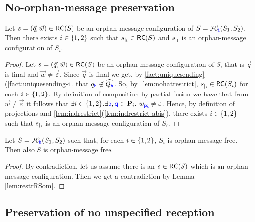 \subsection{No-orphan-message preservation}


\begin{lemma}%
\label{lem:restrRSom}
Let $s= (\vec{q},\vec{w}) \in \mathsf{RC}(S)$ be an orphan-message configuration of $S={\mathcal{F}\!\mathcal{C}}_{\!{\mathtt{\color{blue}{ {h}}}}}(S_1,S_2)$.
Then there exists $i\in \{1,2\}$ such that ${s}_{\mid_{\mathbf{i}}}\in \mathsf{RC}(S)$ and ${s}_{\mid_{\mathbf{i}}}$ is an  orphan-message configuration of $S_i$.
\end{lemma}

\begin{proof}
Let $s= (\vec{q},\vec{w}) \in \mathsf{RC}(S)$ be an orphan-message configuration of $S$, 
that is $\vec{q}$ is final and $\vec{w}\neq \vec{\varepsilon}$.
Since $\vec{q}$ is final we get, by  \cref{fact:uniquesending}(\ref{fact:uniquesending-i},  
that $q_{{\mathtt{\color{blue}{ {h}}}}}\not\in \widehat{Q_{{\mathtt{\color{blue}{ {h}}}}}}$.
So, by~\cref{lem:nohatrestrict}, ${s}_{\mid_{\mathbf{i}}}\in \mathsf{RC}(S_i)$ for each $i\in \{1,2\}$. 
By definition of composition by partial fusion we have that from $\vec{w}\neq \vec{\varepsilon}$
it follows that $\exists i\in \Set{1,2}.\exists \ttp,\ttq\in \roles_i.\ w_{\ttp\ttq}\neq\varepsilon$.
Hence, by definition of projections and \cref{lem:indrestrict}(\ref{lem:indrestrict-abis}),
there exists  $i\in \{1,2\}$ such that
${s}_{\mid_{\mathbf{i}}}$ is an  orphan-message configuration of $S_i$.
\end{proof}


\begin{corollary}%
\label{prop:nomPreservation}
Let $S = {\mathcal{F}\!\mathcal{C}}_{\!{\mathtt{\color{blue}{ {h}}}}}(S_1,S_2)$ such that, for each $i\in \{1,2\}$, 
$S_i$ is orphan-message free.
Then also $S$ is orphan-message free.
\end{corollary}
\begin{proof}
By contradiction, let us assume there is an $s\in \mathsf{RC}(S)$ which is an orphan-message configuration. Then we get
a contradiction by Lemma \ref{lem:restrRSom}.
\end{proof}



\subsection{Preservation of no unspecified reception}


